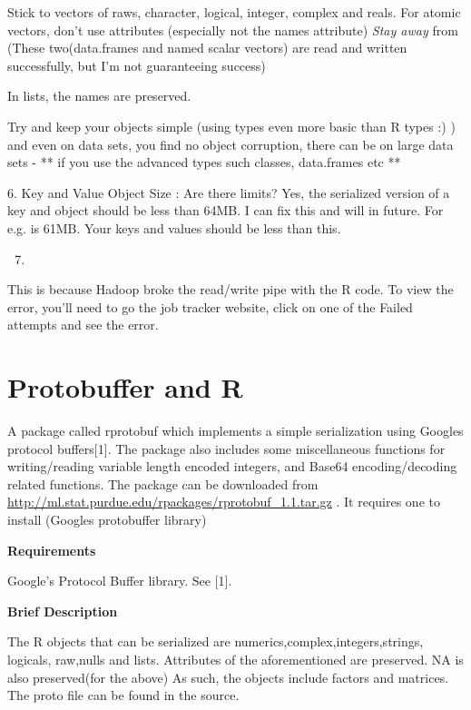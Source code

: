 \documentclass[letterpaper,10pt,english]{sphinxmanual}
\begin{document}
Stick to vectors of raws, character, logical, integer, complex and reals.  For
atomic vectors, don't use attributes (especially not the names attribute) \emph{Stay
away} from  (These two(data.frames and named scalar vectors) are
read and written successfully, but I'm not guaranteeing success)

In lists, the names are preserved.

Try and keep your objects simple (using types even more basic than R types :) ) and even on data sets, you find no object corruption, there can be on large data sets  - ** if you use the advanced types such classes, data.frames etc **

6. Key and Value Object Size : Are there limits?
Yes, the serialized version of a key and object should be less than 64MB. I can fix this and will in future. For e.g.  is 61MB. Your keys and values should be less than this.
\begin{enumerate}
\setcounter{enumi}{6}
\item {} 

\end{enumerate}

This is because Hadoop broke the read/write pipe with the R code. To view the error, you'll need to go the job tracker website, click on one of the Failed attempts and see the error.


\chapter{Protobuffer and R}
\label{ProtoBuffers:protobuffer-and-r}\label{ProtoBuffers::doc}
A package called rprotobuf which implements a simple serialization using Googles
protocol buffers{[}1{]}.  The package also includes some miscellaneous functions for
writing/reading variable length encoded integers, and Base64 encoding/decoding
related functions.  The package can be downloaded from
\href{http://ml.stat.purdue.edu/rpackages/rprotobuf\_1.1.tar.gz}{http://ml.stat.purdue.edu/rpackages/rprotobuf\_1.1.tar.gz} . It requires one to install 
(Googles protobuffer library)

\textbf{Requirements}

Google's Protocol Buffer library. See {[}1{]}.

\textbf{Brief Description}

The R objects that can be serialized are numerics,complex,integers,strings, logicals,
raw,nulls and lists.  Attributes of the aforementioned are preserved. NA is also
preserved(for the above) As such, the objects include factors and matrices.  The proto file can be
found in the source.
\end{document}
